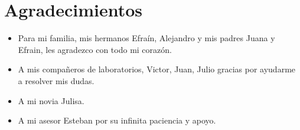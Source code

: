 \chapter{Agradecimientos}
    
    \begin{itemize}
        \item Para mi familia, mis hermanos Efraín, Alejandro y mis padres Juana y Efrain, les agradezco con todo mi corazón.
        \item A mis compañeros de laboratorios, Victor, Juan, Julio gracias por ayudarme a resolver mis dudas.
        \item A mi novia Julisa.
        \item A mi asesor Esteban por su infinita paciencia y apoyo.
    \end{itemize}


